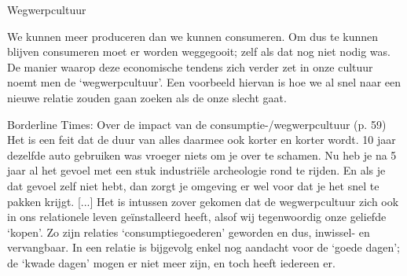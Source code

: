 \documentclass[main.tex]{subfiles}
\begin{document}
\begin{examenvraag}
    \begin{vraag}
        Wegwerpcultuur
    \end{vraag}

    \begin{antwoord}
        We kunnen meer produceren dan we kunnen consumeren.
        Om dus te kunnen blijven consumeren moet er worden weggegooit; zelf als dat nog niet nodig was.
        De manier waarop deze economische tendens zich verder zet in onze cultuur noemt men de `wegwerpcultuur'.
        Een voorbeeld hiervan is hoe we al snel naar een nieuwe relatie zouden gaan zoeken als de onze slecht gaat.
        \begin{citaat}{Borderline Times: Over de impact van de consumptie-/wegwerpcultuur (p. 59)}
            Het is een feit dat de duur van alles daarmee ook korter en korter wordt.
            10 jaar dezelfde auto gebruiken was vroeger niets om je over te schamen.
            Nu heb je na 5 jaar al het gevoel met een stuk industriële archeologie rond te rijden.
            En als je dat gevoel zelf niet hebt, dan zorgt je omgeving er wel voor dat je het snel te pakken krijgt.
            [...]
            Het is intussen zover gekomen dat de wegwerpcultuur zich ook in ons relationele leven geïnstalleerd heeft, alsof wij tegenwoordig onze geliefde `kopen'.
            Zo zijn relaties `consumptiegoederen' geworden en dus, inwissel- en vervangbaar.
            In een relatie is bijgevolg enkel nog aandacht voor de `goede dagen'; de `kwade dagen' mogen er niet meer zijn, en toch heeft iedereen er.
        \end{citaat}
    \end{antwoord}
\end{examenvraag}
\end{document}
